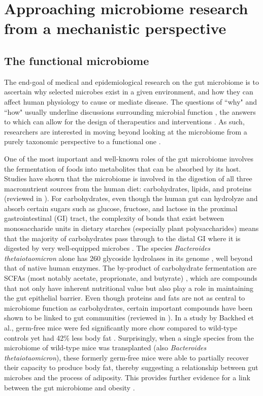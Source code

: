 \section{Approaching microbiome research from a mechanistic perspective}

\subsection{The functional microbiome}

The end-goal of medical and epidemiological research on the gut microbiome is to ascertain why selected microbes exist in a given environment, and how they can affect human physiology to cause or mediate disease. The questions of ``why" and ``how" usually underline discussions surrounding microbial function \cite{klassen2018defining}, the answers to which can allow for the design of therapeutics and interventions \cite{durack2019gut}. As such, researchers are interested in moving beyond looking at the microbiome from a purely taxonomic perspective to a functional one \cite{heintz-buschart2018human}.  

One of the most important and well-known roles of the gut microbiome involves the fermentation of foods into metabolites that can be absorbed by its host. Studies have shown that the microbiome is involved in the digestion of all three macronutrient sources from the human diet: carbohydrates, lipids, and proteins (reviewed in \cite{oliphant2019macronutrient}). For carbohydrates, even though the human gut can hydrolyze and absorb certain sugars such as glucose, fructose, and lactose in the proximal gastrointestinal (GI) tract, the complexity of bonds that exist between monosaccharide units in dietary starches (especially plant polysaccharides) means that the majority of carbohydrates pass through to the distal GI where it is digested by very well-equipped microbes \cite{wong2006colonic}. The species \emph{Bacteroides thetaiotaomicron} alone has 260 glycoside hydrolases in its genome \cite{xu2003genomic}, well beyond that of native human enzymes. The by-product of carbohydrate fermentation are SCFAs (most notably acetate, proprionate, and butyrate) \cite{macfarlane2012bacteria}, which are compounds that not only have inherent nutritional value but also play a role in maintaining the gut epithelial barrier. Even though proteins and fats are not as central to microbiome function as carbohydrates, certain important compounds have been shown to be linked to gut communities (reviewed in \cite{morowitz2011contributions}). In a study by Backhed et al., germ-free mice were fed significantly more chow compared to wild-type controls yet had 42\% less body fat \cite{backhed2004gut}. Surprisingly, when a single species from the microbiome of wild-type mice was transplanted (also \emph{Bacteroides thetaiotaomicron}), these formerly germ-free mice were able to partially recover their capacity to produce body fat, thereby suggesting a relationship between gut microbes and the process of adiposity. This provides further evidence for a link between the gut microbiome and obesity \cite{turnbaugh2009core}. 

